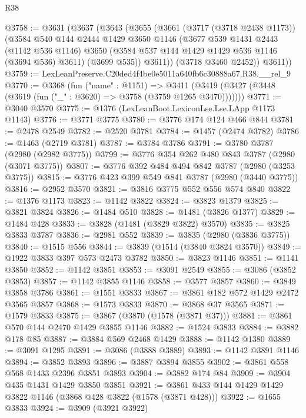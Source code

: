 \begin{lexlean}{R38}
\begin{coremodule}
@3758 := @3631
    (@3637
      (@3643
        (@3655
          (@3661
            (@3717 (@3718 @2438 @1173))
            (@3584
              @540
              @144
              @2444
              @1429
              @3650
              @1146
              (@3677
                @539
                @1431
                @2443
                (@1142 @536 @1146)
                @3650
                (@3584 @537 @144 @1429 @1429 @536 @1146 (@3694 @536) @3611)
                (@3699 @535))
              @3611))
          (@3718 @3460 @2452))
        @3611))
@3759 := LexLeanPreserve.C20ded4f4be0e5011a640fb6c30888a67.R38.__rel_9
@3770 := @3368
    (fun ("name" : @1151) =>
    @3411 (@3419 (@3427 (@3448 (@3619 (fun ("_" : @3620) => @3758 (@3759 @1265 @3470)))))))
@3771 := @3040 @3570
@3775 := @1376 (LexLeanBoot.LexiconLse.Lse.LApp @1173 @1143)
@3776 := @3771 @3775
@3780 := @3776 @174 @124 @466 @844
@3781 := @2478 @2549
@3782 := @2520 @3781
@3784 := @1457 (@2474 @3782)
@3786 := @1463 (@2719 @3781)
@3787 := @3784 @3786
@3791 := @3780 @3787 (@2980 (@2982 @3775))
@3799 := @3776 @354 @262 @480 @843 @3787 (@2980 (@3071 @3775))
@3807 := @3776 @392 @484 @494 @842 @3787 (@2980 (@3253 @3775))
@3815 := @3776 @423 @399 @549 @841 @3787 (@2980 (@3440 @3775))
@3816 := @2952 @3570
@3821 := @3816 @3775 @552 @556 @574 @840
@3822 := @1376 @1173
@3823 := @1142 @3822
@3824 := @3823 @1379
@3825 := @3821 @3824
@3826 := @1484 @510
@3828 := @1481 (@3826 @1377)
@3829 := @1484 @428
@3833 := @3828 (@1481 (@3829 @3822) @3570)
@3835 := @3825 @3833 @3787
@3836 := @2981 @552
@3839 := @3835 (@2980 (@3836 @3775))
@3840 := @1515 @556
@3844 := @3839 (@1514 (@3840 @3824 @3570))
@3849 := @1922 @3833 @397 @573 @2473 @3782
@3850 := @3823 @1146
@3851 := @1141 @3850
@3852 := @1142 @3851
@3853 := @3091 @2549
@3855 := @3086 (@3852 @3853)
@3857 := @1142 @3855 @1146
@3858 := @3577 @3857
@3860 := @3849 @3858 @3786
@3861 := @1551 @3833
@3867 := @3861 @182 @572 @1429 @2472 @3565 @3857
@3868 := @1573 @3833
@3870 := @3868 @37 @3565
@3871 := @1579 @3833
@3875 := @3867 (@3870 (@1578 (@3871 @37)))
@3881 := @3861 @570 @144 @2470 @1429 @3855 @1146
@3882 := @1524 @3833
@3884 := @3882 @178 @85
@3887 := @3884 @569 @2468 @1429
@3888 := @1142 @1380
@3889 := @3091 @1295
@3891 := @3086 (@3888 @3889)
@3893 := @1142 @3891 @1146
@3894 := @3852 @3893
@3896 := @3887 @3894 @3855
@3902 := @3861 @558 @568 @1433 @2396 @3851 @3893
@3904 := @3882 @174 @84
@3909 := @3904 @435 @1431 @1429 @3850 @3851
@3921 := @3861 @433 @144 @1429 @1429 @3822 @1146 (@3868 @428 @3822 (@1578 (@3871 @428)))
@3922 := @1655 @3833
@3924 := @3909 (@3921 @3922)

\end{coremodule}
\end{lexlean}
